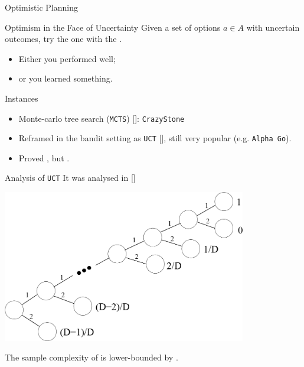 \documentclass{beamer}
\begin{document}
\begin{frame}{Optimistic Planning}
    
    \begin{exampleblock}{Optimism in the Face of Uncertainty}
    Given a set of options $a\in A$ with uncertain outcomes, try the one with the .\pause
    
    \begin{itemize}
        \item Either you performed well;\pause
        \item or you learned something.\pause
    \end{itemize}
    \end{exampleblock}
    
    \begin{block}{Instances}
    \begin{itemize}
        \item Monte-carlo tree search (\texttt{MCTS}) [\cite{Coulom2006}]: \texttt{CrazyStone}
        \item Reframed in the bandit setting as \texttt{UCT} [\cite{Kocsis2006}], still very popular (e.g. \texttt{Alpha Go}).
        \item Proved , but .
    \end{itemize}
    \end{block}
\end{frame}


\begin{frame}{Analysis of \texttt{UCT}}
    It was analysed in [\cite{Coquelin2007}]
    \begin{center}
    \includegraphics[width=0.8\textwidth]{img/uct_fail}
    \end{center}
    The sample complexity of is lower-bounded by .
\end{frame}
\end{document}
